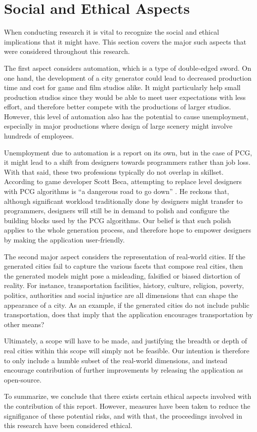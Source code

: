 \section{Social and Ethical Aspects}

When conducting research it is vital to recognize the social and ethical implications that it might have.
This section covers the major such aspects that were considered throughout this research. 

The first aspect considers automation, which is a type of double-edged sword.
On one hand, the development of a city generator could lead to decreased production time and cost for game and film studios alike.
It might particularly help small production studios since they would be able to meet user expectations with less effort, and therefore better compete with the productions of larger studios.
However, this level of automation also has the potential to cause unemployment, especially in major productions where design of large scenery might involve hundreds of employees.

Unemployment due to automation is a report on its own, but in the case of PCG, it might lead to a shift from designers towards programmers rather than job loss.
With that said, these two professions typically do not overlap in skillset.
According to game developer Scott Beca, attempting to replace level designers with PCG algorithms is ``a dangerous road to go down'' \cite{gamasutra}.
He reckons that, although significant workload traditionally done by designers might transfer to programmers, designers will still be in demand to polish and configure the building blocks used by the PCG algorithms.
Our belief is that such polish applies to the whole generation process, and therefore hope to empower designers by making the application user-friendly.

The second major aspect considers the representation of real-world cities.
If the generated cities fail to capture the various facets that compose real cities, then the generated models might pose a misleading, falsified or biased distortion of reality.
For instance, transportation facilities, history, culture, religion, poverty, politics, authorities and social injustice are all dimensions that can shape the appearance of a city.
As an example, if the generated cities do not include public transportation, does that imply that the application encourages transportation by other means?

Ultimately, a scope will have to be made, and justifying the breadth or depth of real cities within this scope will simply not be feasible.
Our intention is therefore to only include a humble subset of the real-world dimensions, and instead encourage contribution of further improvements by releasing the application as open-source.

To summarize, we conclude that there exists certain ethical aspects involved with the contribution of this report.
However, measures have been taken to reduce the signifigance of these potential risks, and with that, the proceedings involved in this research have been considered ethical.

\newpage
